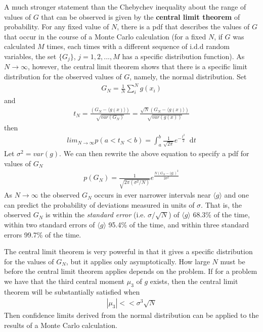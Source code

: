 \documentclass[twoside,english]{uiofysmaster}
\newcommand*\dif{\mathop{}\!\mathrm{d}}
\begin{document}
A much stronger statement than the Chebychev inequality about the range of values of $G$ that can be observed is given by the \textbf{central limit theorem} of probability. For any fixed value of $N$, there is a pdf that describes the values of $G$ that occur in the course of a Monte Carlo calculation (for a fixed $N$, if $G$ was calculated $M$ times, each times with a different sequence of i.d.d random variables, the set $\{ G_j\}$, $j=1,2,...,M$ has a specific distribution function). As $N\rightarrow \infty$, however, the central limit theorem shows that there is a specific limit distribution for the observed values of $G$, namely, the normal distribution. Set
\begin{align}
	G_N = \frac{1}{N} \sum_i^N g(x_i)
\end{align}
and
\begin{align}
	t_N = \frac{(G_N - \langle g(x) \rangle)}{\sqrt{var(G_N)}}
	= \frac{\sqrt{N} (G_N - \langle g(x) \rangle)}{\sqrt{var(g(x))}}
\end{align}
then
\begin{align}
	lim_{N\rightarrow \infty} p(a < t_N < b)
	= \int_a^b \frac{1}{\sqrt{2\pi}} e^{-\frac{t^2}{2}} \dif t
\end{align}
Let $\sigma^2 = var(g)$. We can then rewrite the above equation to specify a pdf for values of $G_N$
\begin{align}
	p(G_N) = \frac{1}{\sqrt{2\pi (\sigma^2/N)}} e^{\frac{N(G_N - \langle g\rangle)^2}{2\sigma^2}}
\end{align}
As $N\rightarrow \infty$ the observed $G_N$ occurs in ever narrower intervals near $\langle g \rangle$ and one can predict the probability of deviations measured in units of $\sigma$. That is, the observed $G_N$ is within the \textit{standard error} (i.e. $\sigma/\sqrt{N}$) of $\langle g \rangle$ 68.3\% of the time, within two standard errors of $\langle g \rangle$ 95.4\% of the time, and within three standard errors 99.7\% of the time.

The central limit theorem is very powerful in that it gives a specific distribution for the values of $G_N$, but it applies only asymptotically. How large $N$ must be before the central limit theorem applies depends on the problem. If for a problem we have that the third central moment $\mu_3$ of $g$ exists, then the central limit theorem will be substantially satisfied when
\begin{align}
	|\mu_3| << \sigma^3 \sqrt{N}
\end{align}
Then confidence limits derived from the normal distribution can be applied to the results of a Monte Carlo calculation. 
\end{document}
